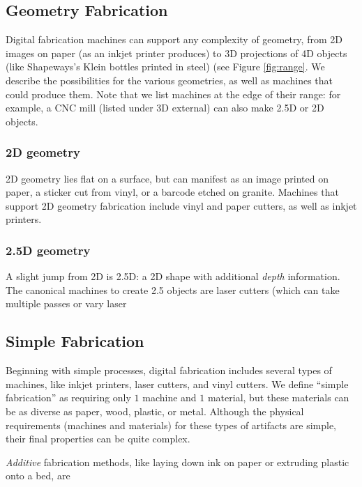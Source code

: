 \subsection{Geometry Fabrication}

Digital fabrication machines can support any complexity of geometry, from 2D images on paper (as an inkjet printer produces) to 3D projections of 4D objects (like Shapeways's Klein bottles printed in steel) (see Figure \ref{fig:range}. We describe the possibilities for the various geometries, as well as machines that could produce them. Note that we list machines at the edge of their range: for example, a CNC mill (listed under 3D external) can also make 2.5D or 2D objects.

\subsubsection{2D geometry}

2D geometry lies flat on a surface, but can manifest as an image printed on paper, a sticker cut from vinyl, or a barcode etched on granite. Machines that support 2D geometry fabrication include vinyl and paper cutters, as well as inkjet printers.

\subsubsection{2.5D geometry}

A slight jump from 2D is 2.5D: a 2D shape with additional \emph{depth} information. The canonical machines to create 2.5 objects are laser cutters (which can take multiple passes or vary laser 

\subsection{Simple Fabrication}
Beginning with simple processes, digital fabrication includes several types of machines, like inkjet printers, laser cutters, and vinyl cutters. We define ``simple fabrication'' as requiring only $1$ machine and $1$ material, but these materials can be as diverse as paper, wood, plastic, or metal. Although the physical requirements (machines and materials) for these types of artifacts are simple, their final properties can be quite complex. 

\emph{Additive} fabrication methods, like laying down ink on paper or extruding plastic onto a bed, are 


